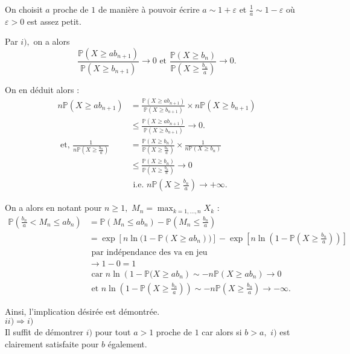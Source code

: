 On choisit $a$ proche de $1$ de manière à pouvoir écrire $\displaystyle a\sim 1+\varepsilon$ et $\displaystyle \frac{1}{a}\sim 1-\varepsilon$ où $\varepsilon>0$ est assez petit.

Par $i),$ on a alors $$ \frac{\mathbb{P}(X\geq ab_{n+1})}{\mathbb{P}(X\geq b_{n+1})}\longrightarrow 0 \mbox{ et } \frac{\mathbb{P}(X\geq b_{n})}{\mathbb{P}(X\geq \frac{b_{n}}{a})}\longrightarrow 0.$$

On en déduit alors :  
\begin{align*}
n\mathbb{P}(X\geq ab_{n+1}) & = \frac{\mathbb{P}(X\geq ab_{n+1})}{\mathbb{P}(X\geq b_{n+1})}\times n\mathbb{P}(X\geq b_{n+1})\\
& \leq \frac{\mathbb{P}(X\geq ab_{n+1})}{\mathbb{P}(X\geq b_{n+1})} \longrightarrow 0.\\
\mbox{ et, } \frac{1}{n\mathbb{P}(X\geq \frac{b_{n}}{a})} & = \frac{\mathbb{P}(X\geq b_{n})}{\mathbb{P}(X\geq \frac{b_{n}}{a})}\times \frac{1}{n\mathbb{P}(X\geq b_{n})}\\
& \leq \frac{\mathbb{P}(X\geq b_{n})}{\mathbb{P}(X\geq \frac{b_{n}}{a})} \longrightarrow 0\\
& \mbox{ i.e. } n\mathbb{P}(X\geq \frac{b_{n}}{a}) \longrightarrow +\infty.
\end{align*}

On a alors en notant pour $n\geq 1,$ $\displaystyle M_{n}=\max_{k=1,\ldots,n}X_{k}$ :
\begin{align*}
\mathbb{P}(\frac{b_{n}}{a}< M_{n} \leq ab_{n}) & = \mathbb{P}(M_{n}\leq ab_{n})-\mathbb{P}(M_{n}\leq \frac{b_{n}}{a})\\
& =\exp\left[ n\ln \big(1-\mathbb{P}(X\geq ab_{n})\big) \right]-\exp\left[ n\ln \left(1-\mathbb{P}(X\geq \frac{b_{n}}{a})\right) \right]\\
& \mbox{ par indépendance des va en jeu}\\
& \longrightarrow 1-0=1\\ 
& \mbox{ car } n\ln\left( 1-\mathbb{P}(X\geq ab_{n}\right)\sim -n\mathbb{P}(X\geq ab_{n})\longrightarrow 0\\
& \mbox{ et } n\ln \left (1-\mathbb{P}(X\geq \frac{b_{n}}{a})\right)\sim -n\mathbb{P}(X\geq \frac{b_{n}}{a})\longrightarrow -\infty.
\end{align*}

Ainsi, l'implication désirée est démontrée.
\\

$\boxed{ii)\Longrightarrow i)}$\\

Il suffit de démontrer $i)$ pour tout $a>1$ proche de $1$ car alors si $b>a,$ $i)$ est clairement satisfaite pour $b$ également.

